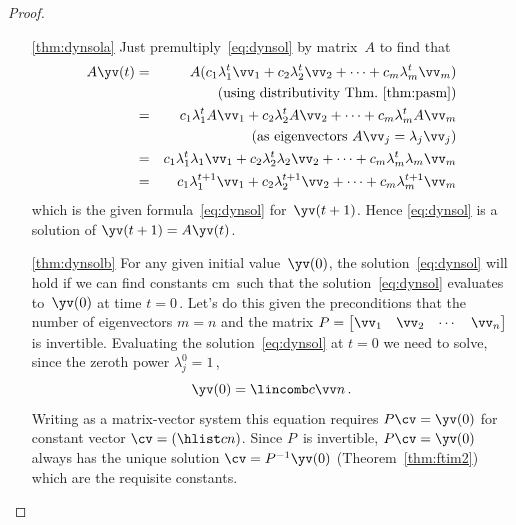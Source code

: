 \begin{proof} \ 
\begin{itemize}
\item[\ref{thm:dynsola}] 
Just premultiply~\eqref{eq:dynsol} by matrix~\(A\) to find that
\begin{eqnarray*}
A\yv(t)&=&A(c_1\lambda_1^t\vv_1+c_2\lambda_2^t\vv_2+\cdots+c_m\lambda_m^t\vv_m)
\\&&\quad(\text{using distributivity Thm.~\ref{thm:pasm}})
\\&=&c_1\lambda_1^tA\vv_1+c_2\lambda_2^tA\vv_2+\cdots+c_m\lambda_m^tA\vv_m
\\&&\quad(\text{as eigenvectors }A\vv_j=\lambda_j\vv_j)
\\&=&c_1\lambda_1^t\lambda_1\vv_1+c_2\lambda_2^t\lambda_2\vv_2+\cdots+c_m\lambda_m^t\lambda_m\vv_m
\\&=&c_1\lambda_1^{t+1}\vv_1+c_2\lambda_2^{t+1}\vv_2+\cdots+c_m\lambda_m^{t+1}\vv_m
\end{eqnarray*}
which is the given formula~\eqref{eq:dynsol} for~\(\yv(t+1)\).
Hence \eqref{eq:dynsol} is a solution of \(\yv(t+1)=A\yv(t)\).

\item[\ref{thm:dynsolb}]
For any given initial value~\(\yv(0)\), the solution~\eqref{eq:dynsol} will hold if we can find constants \hlist cm\ such that the solution~\eqref{eq:dynsol} evaluates to~\(\yv(0)\) at time \(t=0\)\,.
Let's do this given the preconditions that the number of eigenvectors \(m=n\) and the matrix \(P=\begin{bmatrix} \vv_1&\vv_2&\cdots&\vv_n \end{bmatrix}\) is {invertible}.
Evaluating the solution~\eqref{eq:dynsol} at \(t=0\) we need to solve, since the zeroth power \(\lambda_j^0=1\)\,,
\begin{equation*}
\yv(0)=\lincomb c\vv n\,.
\end{equation*}
Writing as a matrix-vector system this equation requires \(P\cv=\yv(0)\) for constant vector \(\cv=(\hlist cn)\).
Since \(P\)~is invertible, \(P\cv=\yv(0)\) always has the unique solution \(\cv=P^{-1}\yv(0)\) (Theorem~\ref{thm:ftim2}) which are the requisite constants.
\end{itemize}
\end{proof}




